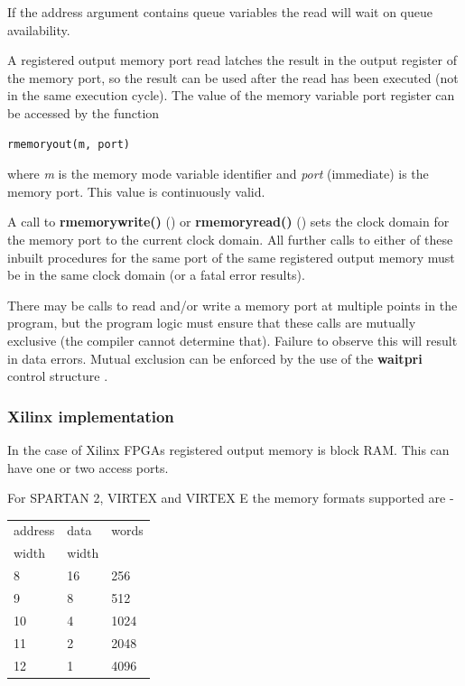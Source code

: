             If the address argument contains queue variables the read
            will wait on queue availability.

            A registered output memory port read latches the result in the
            output register of the memory port, so the result can be used
            after the read has been executed (not in the same execution
            cycle). The value of the memory variable port register can be
            accessed by the function
            \begin{lstlisting}[gobble=12, language=threepl]
                   rmemoryout(m, port)
            \end{lstlisting}
            where {\em m} is the memory mode variable identifier and {\em
            port} (immediate) is the memory port. This value is continuously
            valid.
        
            A call to {\bf rmemorywrite()} () or {\bf rmemoryread()}
            () sets the clock domain for the memory port to the
            current clock domain. All further calls to either of these inbuilt
            procedures for the same port of the same registered output memory
            must be in the same clock domain (or a fatal error results).

            There may be calls to read and/or write a memory port at multiple
            points in the program, but the program logic must ensure that
            these calls are mutually exclusive (the compiler cannot determine
            that). Failure to observe this will result in data errors.
            Mutual exclusion can be enforced by the use of the {\bf waitpri}
            control structure .

            \subsubsection{Xilinx implementation}

                In the case of Xilinx FPGAs registered output memory is
                block RAM. This can have one or two access ports.

                For SPARTAN 2, VIRTEX and VIRTEX E the memory formats supported
                are -

                \begin{tabular}{| l | l | l |}
                \hline
                address & data & words\\
                width & width & \\
                \hline \hline
                8  & 16 & 256   \\ \hline
                9  & 8  & 512   \\ \hline
                10 & 4  & 1024  \\ \hline
                11 & 2  & 2048  \\ \hline
                12 & 1  & 4096  \\ \hline
                \end{tabular}


